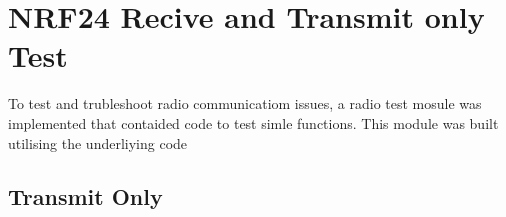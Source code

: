 \chapter{\ac{NRF24} Recive and Transmit only Test}

To test and trubleshoot radio communicatiom issues, a radio test mosule was implemented that
contaided code to test simle functions. This module was built utilising the underliying code


\section{Transmit Only}

